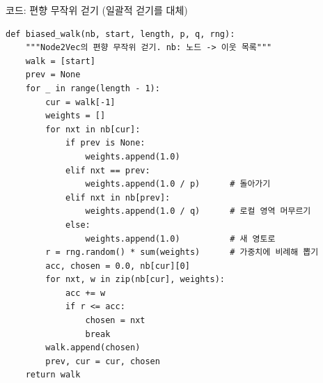 \begin{frame}[fragile]{코드: 편향 무작위 걷기 (일괄적 걷기를 대체)}
\begin{lstlisting}
def biased_walk(nb, start, length, p, q, rng):
    """Node2Vec의 편향 무작위 걷기. nb: 노드 -> 이웃 목록"""
    walk = [start]
    prev = None
    for _ in range(length - 1):
        cur = walk[-1]
        weights = []
        for nxt in nb[cur]:
            if prev is None:
                weights.append(1.0)
            elif nxt == prev:
                weights.append(1.0 / p)      # 돌아가기
            elif nxt in nb[prev]:
                weights.append(1.0 / q)      # 로컬 영역 머무르기
            else:
                weights.append(1.0)          # 새 영토로
        r = rng.random() * sum(weights)      # 가중치에 비례해 뽑기
        acc, chosen = 0.0, nb[cur][0]
        for nxt, w in zip(nb[cur], weights):
            acc += w
            if r <= acc:
                chosen = nxt
                break
        walk.append(chosen)
        prev, cur = cur, chosen
    return walk
\end{lstlisting}
\end{frame}
